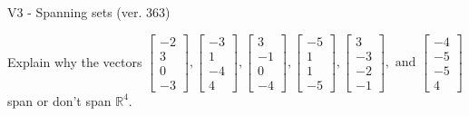 \begin{exercise}
  \begin{exerciseTitle}V3 - Spanning sets (ver. 363)\end{exerciseTitle}
  \begin{exerciseStatement}
    Explain why the vectors \(\left[\begin{array}{r}
-2 \\
3 \\
0 \\
-3
\end{array}\right] , \left[\begin{array}{r}
-3 \\
1 \\
-4 \\
4
\end{array}\right] , \left[\begin{array}{r}
3 \\
-1 \\
0 \\
-4
\end{array}\right] , \left[\begin{array}{r}
-5 \\
1 \\
1 \\
-5
\end{array}\right] , \left[\begin{array}{r}
3 \\
-3 \\
-2 \\
-1
\end{array}\right] , \text{ and } \left[\begin{array}{r}
-4 \\
-5 \\
-5 \\
4
\end{array}\right]\) span or don't span \(\mathbb{R}^4\). 
	



\end{exerciseStatement}
\end{exercise}

